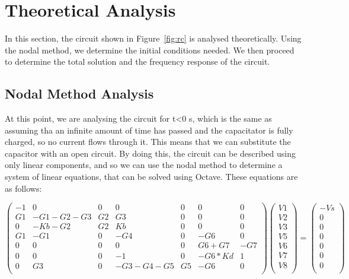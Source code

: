 \section{Theoretical Analysis}
\label{sec:analysis}

In this section, the circuit shown in Figure~\ref{fig:rc} is analysed
theoretically. Using the nodal method, we determine the initial conditions needed. We then proceed to determine the total solution and the frequency response of the circuit.

\subsection{Nodal Method Analysis}

At this point, we are analysing the circuit for t<0 s, which is the same as assuming tha an infinite amount of time has passed and the capacitator is fully charged, so no current flows through it. This means that we can substitute the capacitor with an open circuit. By doing this, the circuit can be described using only linear components, and so we can use the nodal method to determine a system of linear equations, that can be solved using Octave. These equations are as follows: 



\begin{equation}
\begin{pmatrix}
        -1 & 0 & 0 & 0 & 0 & 0 & 0\\
        G1 & -G1-G2-G3 & G2 & G3 & 0 & 0 & 0\\
        0 & -Kb-G2 & G2 & Kb & 0 & 0 & 0\\
        G1 & -G1 & 0 & -G4 & 0 & -G6 & 0\\
        0 & 0 & 0 & 0 & 0 & G6+G7 & -G7\\
        0 & 0 & 0 & -1 & 0 & -G6*Kd & 1\\
        0 & G3 & 0 & -G3-G4-G5 & G5 & -G6 & 0\\
\end{pmatrix}
\begin{pmatrix}
V1\\
V2\\
V3\\
V5\\
V6\\
V7\\
V8\\
\end{pmatrix}
=
\begin{pmatrix}
-Vs\\
0\\
0\\
0\\
0\\
0\\
0\\
\end{pmatrix}
\end{equation}

